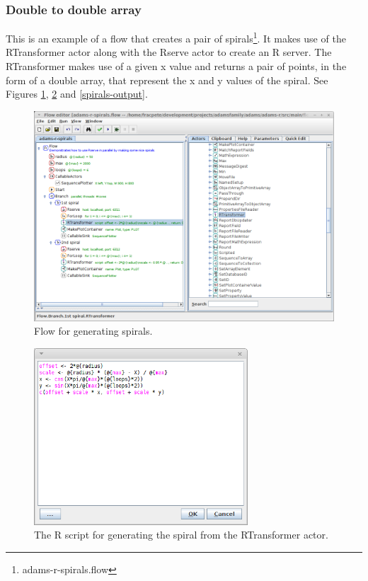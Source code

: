 \documentclass[a4paper]{book}
\begin{document}
\subsubsection{Double to double array}
This is an example of a flow that creates a pair of spirals\footnote{adams-r-spirals.flow}.
It makes use of the RTransformer actor along with the Rserve actor to create an
R server. The RTransformer makes use of a given x value and returns a pair of
points, in the form of a double array, that represent the x and y values of the
spiral. See Figures \ref{spirals-flow}, \ref{spirals-rscript} and \ref{spirals-output}.
\begin{figure}[ht]
	\centering
	\includegraphics[width=\textwidth]{images/spirals-flow.png}
	\caption{Flow for generating spirals.}
	\label{spirals-flow}
\end{figure}
\begin{figure}[ht]
	\centering
	\includegraphics[width=8cm]{images/spirals-rscript.png}
	\caption{The R script for generating the spiral from the RTransformer actor.}
	\label{spirals-rscript}
\end{figure}
\end{document}

